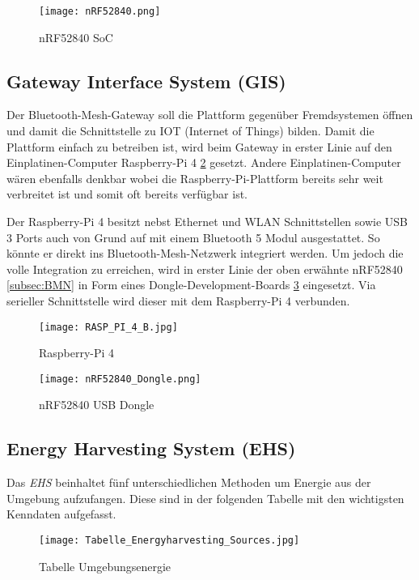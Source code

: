 \begin{figure}[h]
	\centering
	\texttt{[image: nRF52840.png]}
	\caption{nRF52840 SoC}
	\label{img:nRF52840}
\end{figure} 

\subsection{Gateway Interface System (GIS)}\label{subsec:Gateway}
Der Bluetooth-Mesh-Gateway soll die Plattform gegenüber Fremdsystemen öffnen und damit die Schnittstelle zu IOT (Internet of Things) bilden. Damit die Plattform einfach zu betreiben ist, wird beim Gateway in erster Linie auf den Einplatinen-Computer Raspberry-Pi 4 \ref{img:raspberryPi4} gesetzt. Andere Einplatinen-Computer wären ebenfalls denkbar wobei die Raspberry-Pi-Plattform bereits sehr weit verbreitet ist und somit oft bereits verfügbar ist.

Der Raspberry-Pi 4 besitzt nebst Ethernet und WLAN Schnittstellen sowie USB 3 Ports auch von Grund auf mit einem Bluetooth 5 Modul ausgestattet. So könnte er direkt ins Bluetooth-Mesh-Netzwerk integriert werden. Um jedoch die volle Integration zu erreichen, wird in erster Linie der oben erwähnte nRF52840 \ref{subsec:BMN} in Form eines Dongle-Development-Boards \ref{img:nRF52840USBDongle} eingesetzt. Via serieller Schnittstelle wird dieser mit dem Raspberry-Pi 4 verbunden.


\begin{figure}[h]
	\centering
	\texttt{[image: RASP\_PI\_4\_B.jpg]}
	\caption{Raspberry-Pi 4 \cite{reichelt_elektronik_gmbh_&_co_kg_rasp_nodate}}
	\label{img:raspberryPi4}
\end{figure} 

\begin{figure}[h]
	\centering
	\texttt{[image: nRF52840\_Dongle.png]}
	\caption{nRF52840 USB Dongle \cite{nordic_semiconductor_nrf52840-dongle-promo.png_nodate}}
	\label{img:nRF52840USBDongle}
\end{figure} 


\subsection{Energy Harvesting System (EHS)}\label{subsec:EHS}

Das \textit{EHS} beinhaltet fünf unterschiedlichen Methoden um Energie aus der Umgebung aufzufangen. Diese sind in der folgenden Tabelle mit den wichtigsten Kenndaten aufgefasst. 

\begin{figure}[h]
	\centering
	\texttt{[image: Tabelle\_Energyharvesting\_Sources.jpg]}
	\caption{Tabelle Umgebungsenergie \cite{nordic_semiconductor_nrf52840-dongle-promo.png_nodate}}
	\label{img:Tabelle_Energyharvesting_Sources}
\end{figure} 